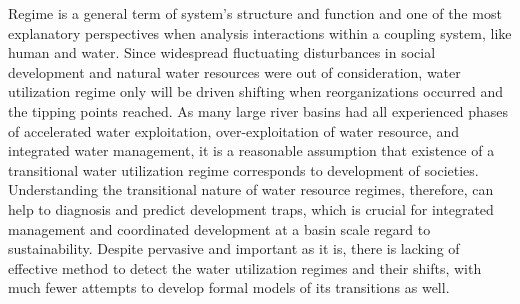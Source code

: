 \documentclass[9pt, twocolumn, twoside, lineno]{pnas-new}
\begin{document}
Regime is a general term of system’s structure and function 
and one of the most explanatory perspectives when analysis interactions within a coupling system, 
like human and water.
Since widespread fluctuating disturbances in social development and natural water resources were out of consideration, 
water utilization regime only will be driven shifting when reorganizations occurred and the tipping points reached.
As many large river basins had all experienced phases of accelerated water exploitation, over-exploitation of water resource,
and integrated water management, it is a reasonable assumption that existence of a transitional water utilization regime 
corresponds to development of societies. 
Understanding the transitional nature of water resource regimes, therefore, can help to diagnosis and predict development traps, 
which is crucial for integrated management and coordinated development at a basin scale regard to sustainability.
Despite pervasive and important as it is, there is lacking of effective method to detect the water utilization regimes and their shifts, 
with much fewer attempts to develop formal models of its transitions as well. 
\end{document}
